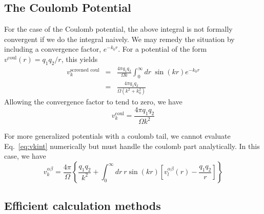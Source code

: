 \subsection{The Coulomb Potential}
For the case of the Coulomb potential, the above integral is not
formally convergent if we do the integral naively. We may remedy the
situation by including a convergence factor, $e^{-k_0 r}$.  For a
potential of the form $v^{\text{coul}}(r) = q_1 q_2/r$, this yields
\begin{eqnarray}
v^{\text{screened coul}}_k & = & \frac{4\pi q_1 q_2}{\Omega k} \int_0^\infty dr\ \sin(kr)
e^{-k_0r} \\ 
& = & \frac{4\pi q_1 q_2}{\Omega (k^2 + k_0^2)}
\end{eqnarray}
Allowing the convergence factor to tend to zero, we have
\begin{equation}
v_k^\text{coul} = \frac{4 \pi q_1 q_2}{\Omega k^2}
\end{equation}

For more generalized potentials with a coulomb tail, we cannot
evaluate Eq.~\ref{eq:vkint} numerically but must handle the coulomb part
analytically.  In this case, we have
\begin{equation}
v_k^{\alpha \beta} = \frac{4\pi}{\Omega} 
\left\{ \frac{q_1 q_2}{k^2} + \int_0^\infty dr \ r \sin(kr) \left[ v_l^{\alpha \beta}(r) -
  \frac{q_1 q_2}{r} \right] \right\}
\end{equation}

\subsection{Efficient calculation methods}
